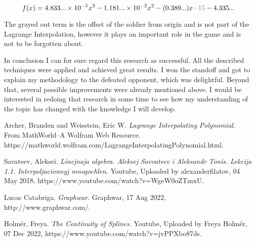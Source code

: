 \documentclass[12pt, titlepage]{article}
\begin{document}
\newcommand\smalldots{\makebox[0.75em][c]{.\hfil.\hfil.}}

$$f(x) = 4.833\smalldots \times 10^{-5} x^3- 1.181\smalldots{} \times 10^{-2} x^2 - (0.389\smalldots{}) x \textcolor{gray}{- 15} - 4.335\smalldots$$

The grayed out term is the offset of the soldier from origin and is not part of the
Lagrange Interpolation, however it plays an important role in the game and 
is not to be forgotten about.

In conclusion I can for sure regard this research as successful. All the
described techniques were applied and achieved great results. I won the
standoff and got to explain my methodology to the defeated opponent, which
was delightful. Beyond that, several possible improvements were already 
mentioned above. I would be interested in redoing that research in some time
to see how my understanding of the topic has changed with the knowledge I will
develop.

\begin{thebibliography}{1}

Archer, Branden and Weisstein, Eric W. {\em Lagrange Interpolating Polynomial.}
From MathWorld--A Wolfram Web Resource. https://mathworld.wolfram.com/LagrangeInterpolatingPolynomial.html.

Savateev, Aleksei. {\em Linejnaja algebra. Aleksej Savvateev i Aleksandr Tonis. Lekcija 1.1. Interpoljacionnyj mnogochlen.}
Youtube, Uploaded by alexanderfilatov, 04 May 2018, https://www.youtube.com/watch?v=WgeW0oZTmxU.

Lucas Catabriga. {\em Graphwar.} Graphwar, 17 Aug 2022, http://www.graphwar.com/.

Holm\'{e}r, Freya. {\em The Continuity of Splines.}
Youtube, Uploaded by Freya Holm\'{e}r, 07 Dec 2022, https://www.youtube.com/watch?v=jvPPXbo87ds.


\end{thebibliography}
  
\end{document}
